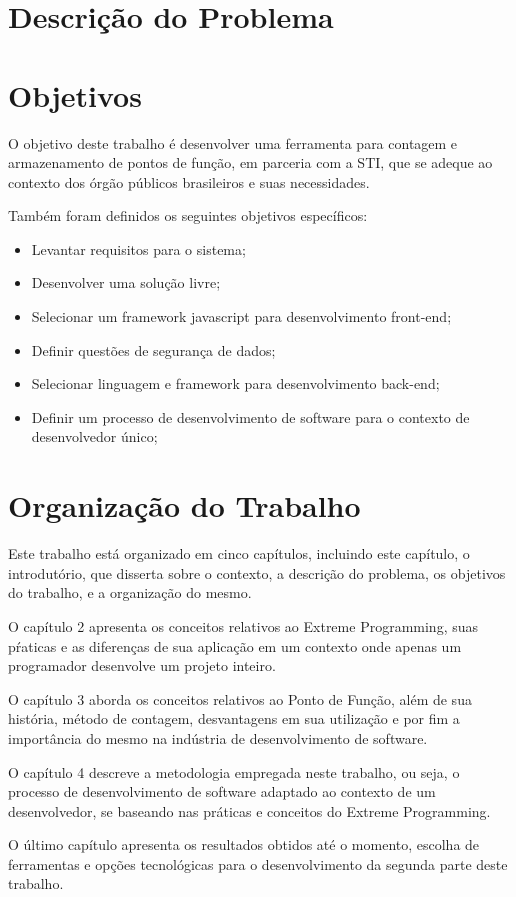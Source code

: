 \section{Descrição do Problema}

\section{Objetivos}

O objetivo deste  trabalho é desenvolver uma ferramenta para contagem e
armazenamento de pontos de função, em parceria com a STI,  que se adeque ao
contexto dos órgão públicos brasileiros e suas necessidades.

Também foram definidos os seguintes objetivos específicos:

\begin{itemize}

  \item Levantar requisitos para o sistema;

  \item Desenvolver uma solução livre;

  \item Selecionar um framework javascript para desenvolvimento front-end;

  \item  Definir questões de segurança de dados;

  \item Selecionar linguagem e framework para desenvolvimento back-end;

  \item Definir um processo de desenvolvimento de software para o contexto de
  desenvolvedor único;

\end{itemize}


\section{Organização do Trabalho}

Este trabalho está organizado em cinco capítulos, incluindo este capítulo, o
introdutório, que disserta sobre o contexto, a descrição do problema, os
objetivos do trabalho, e a organização do mesmo.

O capítulo 2 apresenta os conceitos relativos ao Extreme Programming, suas
pŕaticas e as diferenças de sua aplicação em um contexto onde apenas um
programador desenvolve um projeto inteiro.

O capítulo 3 aborda os conceitos relativos ao Ponto de Função, além de sua história, método de contagem, desvantagens em sua utilização e por fim  a
importância do mesmo na indústria de desenvolvimento de software.

O capítulo 4 descreve a metodologia empregada neste trabalho, ou seja,
o processo de desenvolvimento de software adaptado ao contexto de um
desenvolvedor, se baseando nas práticas e conceitos do Extreme Programming.

O último capítulo apresenta os resultados obtidos até o momento, escolha de
ferramentas e opções tecnológicas para o desenvolvimento da segunda parte deste
trabalho.
